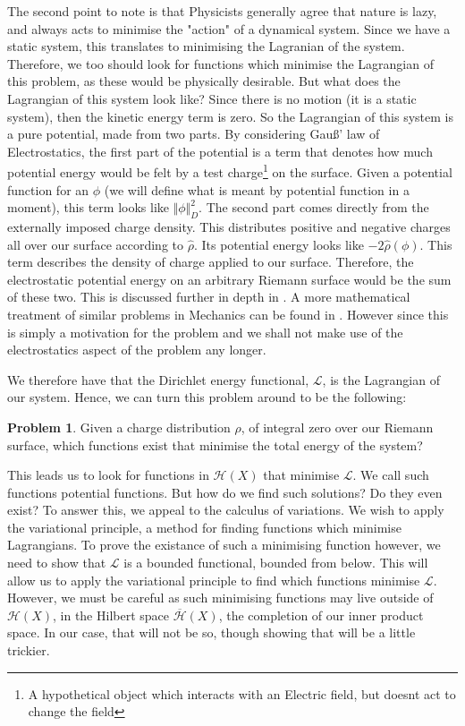 \documentclass[11pt]{report}
\theoremstyle{definition}
\newtheorem*{problem}{Problem}
\begin{document}
The second point to note is that Physicists generally agree that nature is lazy, and always acts to minimise the "action" of a dynamical system. Since we have a static system, this translates to minimising the Lagranian of the system. Therefore, we too should look for functions which minimise the Lagrangian of this problem, as these would be physically desirable. But what does the Lagrangian of this system look like? Since there is no motion (it is a static system), then the kinetic energy term is zero. So the Lagrangian of this system is a pure potential, made from two parts. By considering Gau\ss ' law of Electrostatics, the first part of the potential is a term that denotes how much potential energy would be felt by a test charge\footnote{A hypothetical object which interacts with an Electric field, but doesnt act to change the field} on the surface. Given a potential function for an $\phi$ (we will define what is meant by potential function in a moment), this term looks like $\Vert \phi \Vert_D^2$. The second part comes directly from the externally imposed charge density. This distributes positive and negative charges all over our surface according to $\hat{\rho}$. Its potential energy looks like $-2\hat{\rho}(\phi)$. This term describes the density of charge applied to our surface. Therefore, the electrostatic potential energy on an arbitrary Riemann surface would be the sum of these two. This is discussed further in depth in \cite{electromagentismBook}. A more mathematical treatment of similar problems in Mechanics can be found in \cite[(Chapters 6 and 12)]{arnold}. However since this is simply a motivation for the problem and we shall not make use of the electrostatics aspect of the problem any longer.

We therefore have that the Dirichlet energy functional, $\mathcal{L}$, is the Lagrangian of our system. Hence, we can turn this problem around to be the following:
\begin{problem}
  Given a charge distribution $\rho$, of integral zero over our Riemann surface, which functions exist that minimise the total energy of the system?
\end{problem}
This leads us to look for functions in $\mathcal{H}(X)$ that minimise $\mathcal{L}$. We call such functions potential functions. But how do we find such solutions? Do they even exist? To answer this, we appeal to the calculus of variations. We wish to apply the variational principle, a method for finding functions which minimise Lagrangians. To prove the existance of such a minimising function however, we need to show that $\mathcal{L}$ is a bounded functional, bounded from below. This will allow us to apply the variational principle to find which functions minimise $\mathcal{L}$. However, we must be careful as such minimising functions may live outside of $\mathcal{H}(X)$, in the Hilbert space $\overline{\mathcal{H}}(X)$, the completion of our inner product space. In our case, that will not be so, though showing that will be a little trickier.
\end{document}
